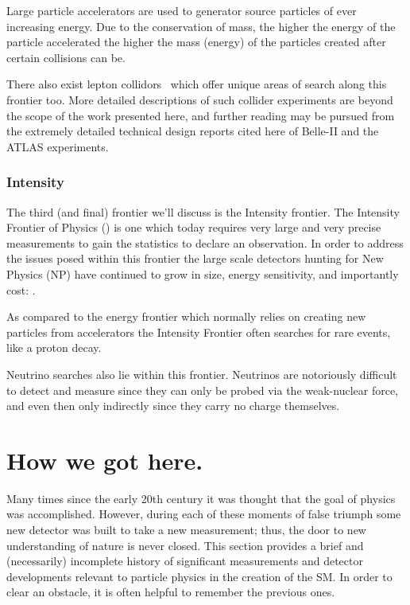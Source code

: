 Large particle accelerators are used to generator source particles of ever increasing energy.
Due to the conservation of mass, the higher the energy of the particle accelerated the higher the mass (energy) of the particles created after certain collisions can be.

There also exist lepton collidors~\citep{belle2_tdr_arxiv} which offer unique areas of search along this frontier too.
More detailed descriptions of such collider experiments are beyond the scope of the work presented here, and further reading may be pursued from the extremely detailed technical design reports cited here of Belle-II and the ATLAS experiments.

\subsubsection{Intensity}

The third (and final) frontier we'll discuss is the Intensity frontier.
The Intensity Frontier of Physics (\citep{intensityfrontier2012_Hewett}) is one which today requires very large and very precise measurements to gain the statistics to declare an observation.
In order to address the issues posed within this frontier the large scale detectors hunting for New Physics (NP) have continued to grow in size, energy sensitivity, and importantly cost: \citep{Juno:2022103927}.

As compared to the energy frontier which normally relies on creating new particles from accelerators the Intensity Frontier often searches for rare events, like a proton decay.

Neutrino searches also lie within this frontier.
Neutrinos are notoriously difficult to detect and measure since they can only be probed via the weak-nuclear force, and even then only indirectly since they carry no charge themselves.

\section{How we got here.}

Many times since the early 20th century it was thought that the goal of physics was accomplished.
However, during each of these moments of false triumph some new detector was built to take a new measurement; thus, the door to new understanding of nature is never closed.
This section provides a brief and (necessarily) incomplete history of significant measurements and detector developments relevant to particle physics in the creation of the SM.
In order to clear an obstacle, it is often helpful to remember the previous ones.


